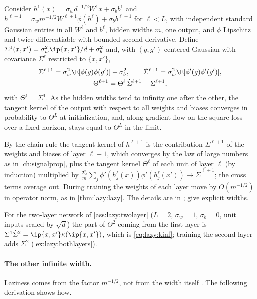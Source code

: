 \begin{refsection}
\begin{theorem}\label{thm:lazy:deepntk}
Consider $h^1(x)=\sigma_wd^{-1/2}W^1x+\sigma_bb^1$ and $h^{\ell+1}=\sigma_wm^{-1/2}W^{\ell+1}\phi(h^\ell)+\sigma_bb^{\ell+1}$ for $\ell<L$, with independent standard Gaussian entries in all $W^\ell$ and $b^\ell$, hidden widths $m$, one output, and $\phi$ Lipschitz and twice differentiable with bounded second derivative. Define $\Sigma^1(x,x')=\sigma_w^2\ip{x,x'}/d+\sigma_b^2$ and, with $(g,g')$ centered Gaussian with covariance $\Sigma^\ell$ restricted to $\{x,x'\}$,
\begin{gather*}
  \Sigma^{\ell+1}=\sigma_w^2\E[\phi(g)\phi(g')]+\sigma_b^2,\qquad \dot\Sigma^{\ell+1}=\sigma_w^2\E[\phi'(g)\phi'(g')],\\
  \Theta^{\ell+1}=\Theta^\ell\,\dot\Sigma^{\ell+1}+\Sigma^{\ell+1},
\end{gather*}
with $\Theta^1=\Sigma^1$. As the hidden widths tend to infinity one after the other, the tangent kernel of the output with respect to all weights and biases converges in probability to $\Theta^L$ at initialization, and, along gradient flow on the square loss over a fixed horizon, stays equal to $\Theta^L$ in the limit.
\end{theorem}

\begin{proofsketch}
By the chain rule the tangent kernel of $h^{\ell+1}$ is the contribution $\Sigma^{\ell+1}$ of the weights and biases of layer $\ell+1$, which converges by the law of large numbers as in \cref{ch:signalprop}, plus the tangent kernel $\Theta^\ell$ of each unit of layer $\ell$ (by induction) multiplied by $\frac{\sigma_w^2}m\sum_j\phi'(h^\ell_j(x))\phi'(h^\ell_j(x'))\to\dot\Sigma^{\ell+1}$; the cross terms average out. During training the weights of each layer move by $O(m^{-1/2})$ in operator norm, as in \cref{thm:lazy:lazy}. The details are in \textcite[Theorems~1 and~2]{JacotEtAl2018}; \textcite{AroraEtAl2019a} give explicit widths.
\end{proofsketch}

For the two-layer network of \cref{ass:lazy:twolayer} ($L=2$, $\sigma_w=1$, $\sigma_b=0$, unit inputs scaled by $\sqrt d$) the part of $\Theta^2$ coming from the first layer is $\Sigma^1\dot\Sigma^2=\ip{x,x'}\kappa(\ip{x,x'})$, which is \eqref{eq:lazy:kinf}; training the second layer adds $\Sigma^2$ (\cref{ex:lazy:bothlayers}).

\paragraph{The other infinite width.} Laziness comes from the factor $m^{-1/2}$, not from the width itself \parencite{ChizatEtAl2019}. The following derivation shows how.


\end{refsection}
